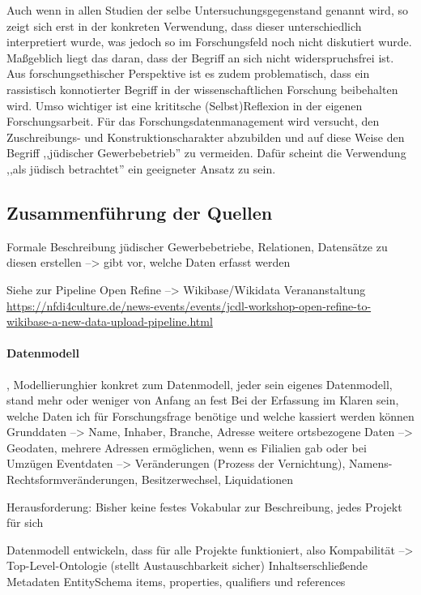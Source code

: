 Auch wenn in allen Studien der selbe Untersuchungsgegenstand genannt wird, so zeigt sich erst in der konkreten Verwendung, dass dieser unterschiedlich interpretiert wurde, was jedoch so im Forschungsfeld noch nicht diskutiert wurde. Maßgeblich liegt das daran, dass der Begriff an sich nicht widerspruchsfrei ist. Aus forschungsethischer Perspektive ist es zudem problematisch, dass ein rassistisch konnotierter Begriff in der wissenschaftlichen Forschung beibehalten wird. Umso wichtiger ist eine krititsche (Selbst)Reflexion in der eigenen Forschungsarbeit. Für das Forschungsdatenmanagement wird versucht, den Zuschreibungs- und Konstruktionscharakter abzubilden und auf diese Weise den Begriff ,,jüdischer Gewerbebetrieb'' zu vermeiden. Dafür scheint die Verwendung ,,als jüdisch betrachtet'' ein geeigneter Ansatz zu sein.

\subsection{Zusammenführung der Quellen}
Formale Beschreibung jüdischer Gewerbebetriebe, Relationen, Datensätze zu diesen erstellen --> gibt vor, welche Daten erfasst werden

Siehe zur Pipeline Open Refine --> Wikibase/Wikidata Verananstaltung \url{https://nfdi4culture.de/news-events/events/jcdl-workshop-open-refine-to-wikibase-a-new-data-upload-pipeline.html}
\paragraph{Datenmodell}, Modellierunghier konkret zum Datenmodell, jeder sein eigenes Datenmodell, stand mehr oder weniger von Anfang an fest
Bei der Erfassung im Klaren sein, welche Daten ich für Forschungsfrage benötige und welche kassiert werden können
Grunddaten --> Name, Inhaber, Branche, Adresse
weitere ortsbezogene Daten --> Geodaten, mehrere Adressen ermöglichen, wenn es Filialien gab oder bei Umzügen
Eventdaten --> Veränderungen (Prozess der Vernichtung), Namens-Rechtsformveränderungen, Besitzerwechsel, Liquidationen

Herausforderung: Bisher keine festes Vokabular zur Beschreibung, jedes Projekt für sich 

Datenmodell entwickeln, dass für alle Projekte funktioniert, also 
Kompabilität --> Top-Level-Ontologie (stellt Austauschbarkeit sicher)
Inhaltserschließende Metadaten
EntitySchema items, properties, qualifiers und references

